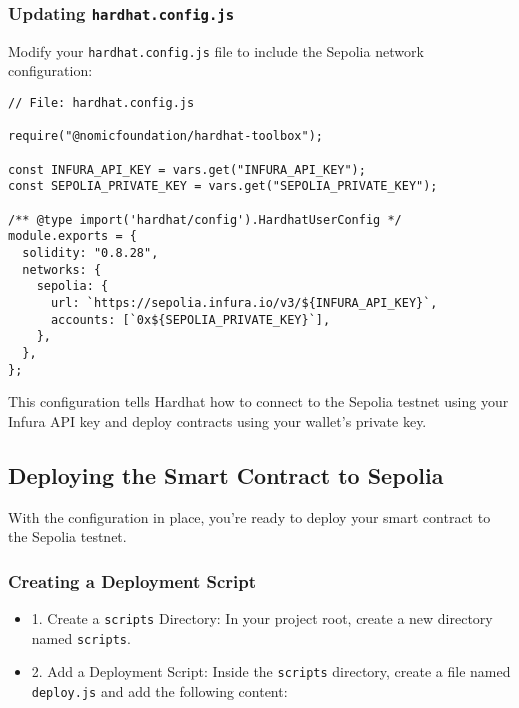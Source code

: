 \documentclass[12pt]{article}
\begin{document}
\subsubsection*{Updating \texttt{hardhat.config.js}}

Modify your \texttt{hardhat.config.js} file to include the Sepolia network configuration:

\begin{verbatim}
// File: hardhat.config.js

require("@nomicfoundation/hardhat-toolbox");

const INFURA_API_KEY = vars.get("INFURA_API_KEY");
const SEPOLIA_PRIVATE_KEY = vars.get("SEPOLIA_PRIVATE_KEY");

/** @type import('hardhat/config').HardhatUserConfig */
module.exports = {
  solidity: "0.8.28",
  networks: {
    sepolia: {
      url: `https://sepolia.infura.io/v3/${INFURA_API_KEY}`,
      accounts: [`0x${SEPOLIA_PRIVATE_KEY}`],
    },
  },
};
\end{verbatim}

This configuration tells Hardhat how to connect to the Sepolia testnet using your Infura API key and deploy contracts using your wallet's private key.

\subsection{Deploying the Smart Contract to Sepolia}

With the configuration in place, you're ready to deploy your smart contract to the Sepolia testnet.

\subsubsection{Creating a Deployment Script}

\begin{itemize}
\item 1. Create a \texttt{scripts} Directory: In your project root, create a new directory named \texttt{scripts}.

\item 2. Add a Deployment Script: Inside the \texttt{scripts} directory, create a file named \texttt{deploy.js} and add the following content:
\end{itemize}
\end{document}
